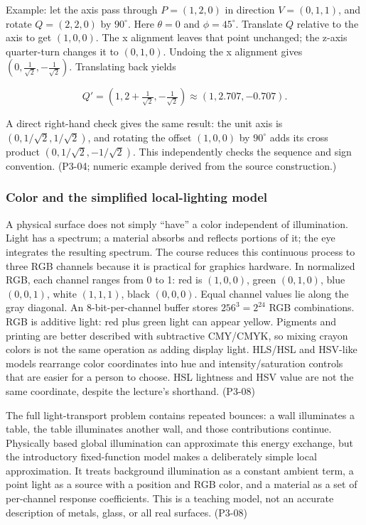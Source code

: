 Example: let the axis pass through \(P=(1,2,0)\) in direction \(V=(0,1,1)\), and rotate \(Q=(2,2,0)\) by \(90^\circ\). Here \(\theta=0\) and \(\phi=45^\circ\). Translate \(Q\) relative to the axis to get \((1,0,0)\). The x alignment leaves that point unchanged; the z-axis quarter-turn changes it to \((0,1,0)\). Undoing the x alignment gives \((0,\frac{1}{\sqrt2},-\frac{1}{\sqrt2})\). Translating back yields

\[
Q'=(1,2+\tfrac{1}{\sqrt2},-\tfrac{1}{\sqrt2})\approx(1,2.707,-0.707).
\]

A direct right-hand check gives the same result: the unit axis is \((0,1/\sqrt2,1/\sqrt2)\), and rotating the offset \((1,0,0)\) by \(90^\circ\) adds its cross product \((0,1/\sqrt2,-1/\sqrt2)\). This independently checks the sequence and sign convention. (P3-04; numeric example derived from the source construction.)

\subsubsection{Color and the simplified local-lighting model}\label{03-visual-computing-i-ch011-color-and-the-simplified-local-lighting-model}

A physical surface does not simply ``have'' a color independent of illumination. Light has a spectrum; a material absorbs and reflects portions of it; the eye integrates the resulting spectrum. The course reduces this continuous process to three RGB channels because it is practical for graphics hardware. In normalized RGB, each channel ranges from 0 to 1: red is \((1,0,0)\), green \((0,1,0)\), blue \((0,0,1)\), white \((1,1,1)\), black \((0,0,0)\). Equal channel values lie along the gray diagonal. An 8-bit-per-channel buffer stores \(256^3=2^{24}\) RGB combinations. RGB is additive light: red plus green light can appear yellow. Pigments and printing are better described with subtractive CMY/CMYK, so mixing crayon colors is not the same operation as adding display light. HLS/HSL and HSV-like models rearrange color coordinates into hue and intensity/saturation controls that are easier for a person to choose. HSL lightness and HSV value are not the same coordinate, despite the lecture's shorthand. (P3-08)

The full light-transport problem contains repeated bounces: a wall illuminates a table, the table illuminates another wall, and those contributions continue. Physically based global illumination can approximate this energy exchange, but the introductory fixed-function model makes a deliberately simple local approximation. It treats background illumination as a constant ambient term, a point light as a source with a position and RGB color, and a material as a set of per-channel response coefficients. This is a teaching model, not an accurate description of metals, glass, or all real surfaces. (P3-08)

